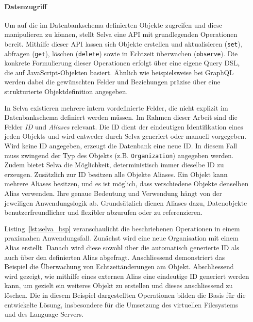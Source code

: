 


\paragraph{Datenzugriff}
Um auf die im Datenbankschema definierten Objekte zugreifen und diese manipulieren zu können, stellt Selva eine API mit grundlegenden Operationen bereit. Mithilfe dieser API lassen sich Objekte erstellen und aktualisieren (\texttt{set}), abfragen (\texttt{get}), löschen (\texttt{delete}) sowie in Echtzeit überwachen (\texttt{observe}). Die konkrete Formulierung dieser Operationen erfolgt über eine eigene Query DSL, die auf JavaScript-Objekten basiert. Ähnlich wie beispielsweise bei GraphQL werden dabei die gewünschten Felder und Beziehungen präzise über eine strukturierte Objektdefinition angegeben.

In Selva existieren mehrere intern vordefinierte Felder, die nicht explizit im Datenbankschema definiert werden müssen. Im Rahmen dieser Arbeit sind die Felder \textit{ID} und \textit{Aliases} relevant. Die ID dient der eindeutigen Identifikation eines jeden Objekts und wird entweder durch Selva generiert oder manuell vorgegeben. Wird keine ID angegeben, erzeugt die Datenbank eine neue ID. In diesem Fall muss zwingend der Typ des Objekts (z.B. \texttt{Organization}) angegeben werden. Zudem bietet Selva die Möglichkeit, deterministisch immer dieselbe ID zu erzeugen. Zusätzlich zur ID besitzen alle Objekte Aliases. Ein Objekt kann mehrere Aliases besitzen, und es ist möglich, dass verschiedene Objekte denselben Alias verwenden. Ihre genaue Bedeutung und Verwendung hängt von der jeweiligen Anwendungslogik ab. Grundsätzlich dienen Aliases dazu, Datenobjekte benutzerfreundlicher und flexibler abzurufen oder zu referenzieren.

Listing~\ref{lst:selva_bsp} veranschaulicht die beschriebenen Operationen in einem praxisnahen Anwendungsfall. Zunächst wird eine neue Organisation mit einem Alias erstellt. Danach wird diese sowohl über die automatisch generierte ID als auch über den definierten Alias abgefragt. Anschliessend demonstriert das Beispiel die Überwachung von Echtzeitänderungen am Objekt. Abschliessend wird gezeigt, wie mithilfe eines externen Alias eine eindeutige ID generiert werden kann, um gezielt ein weiteres Objekt zu erstellen und dieses anschliessend zu löschen. Die in diesem Beispiel dargestellten Operationen bilden die Basis für die entwickelte Lösung, insbesondere für die Umsetzung des virtuellen Filesystems und des Language Servers.

